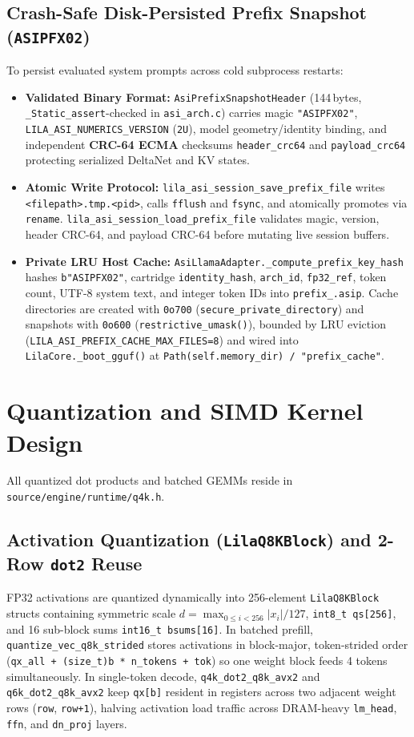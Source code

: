 \documentclass[11pt,a4paper]{article}
\begin{document}
\subsection{Crash-Safe Disk-Persisted Prefix Snapshot (\texttt{ASIPFX02})}
To persist evaluated system prompts across cold subprocess restarts:
\begin{itemize}
    \item \textbf{Validated Binary Format:} \texttt{AsiPrefixSnapshotHeader} (144\,bytes, \texttt{\_Static\_assert}-checked in \texttt{asi\_arch.c}) carries magic \texttt{"ASIPFX02"}, \texttt{LILA\_ASI\_NUMERICS\_VERSION} (\texttt{2U}), model geometry/identity binding, and independent \textbf{CRC-64 ECMA} checksums \texttt{header\_crc64} and \texttt{payload\_crc64} protecting serialized DeltaNet and KV states.
    \item \textbf{Atomic Write Protocol:} \texttt{lila\_asi\_session\_save\_prefix\_file} writes \texttt{<filepath>.tmp.<pid>}, calls \texttt{fflush} and \texttt{fsync}, and atomically promotes via \texttt{rename}. \texttt{lila\_asi\_session\_load\_prefix\_file} validates magic, version, header CRC-64, and payload CRC-64 before mutating live session buffers.
    \item \textbf{Private LRU Host Cache:} \texttt{AsiLlamaAdapter.\_compute\_prefix\_key\_hash} hashes \texttt{b"ASIPFX02"}, cartridge \texttt{identity\_hash}, \texttt{arch\_id}, \texttt{fp32\_ref}, token count, UTF-8 system text, and integer token IDs into \texttt{prefix\_<hex16>.asip}. Cache directories are created with \texttt{0o700} (\texttt{secure\_private\_directory}) and snapshots with \texttt{0o600} (\texttt{restrictive\_umask()}), bounded by LRU eviction (\texttt{LILA\_ASI\_PREFIX\_CACHE\_MAX\_FILES=8}) and wired into \texttt{LilaCore.\_boot\_gguf()} at \texttt{Path(self.memory\_dir) / "prefix\_cache"}.
\end{itemize}

\section{Quantization and SIMD Kernel Design}

All quantized dot products and batched GEMMs reside in \texttt{source/engine/runtime/q4k.h}.

\subsection{Activation Quantization (\texttt{LilaQ8KBlock}) and 2-Row \texttt{dot2} Reuse}
FP32 activations are quantized dynamically into 256-element \texttt{LilaQ8KBlock} structs containing symmetric scale $d = \max_{0 \le i < 256}|x_i| / 127$, \texttt{int8\_t qs[256]}, and 16 sub-block sums \texttt{int16\_t bsums[16]}. In batched prefill, \texttt{quantize\_vec\_q8k\_strided} stores activations in block-major, token-strided order (\texttt{qx\_all + (size\_t)b * n\_tokens + tok}) so one weight block feeds 4 tokens simultaneously. In single-token decode, \texttt{q4k\_dot2\_q8k\_avx2} and \texttt{q6k\_dot2\_q8k\_avx2} keep \texttt{qx[b]} resident in registers across two adjacent weight rows (\texttt{row}, \texttt{row+1}), halving activation load traffic across DRAM-heavy \texttt{lm\_head}, \texttt{ffn}, and \texttt{dn\_proj} layers.
\end{document}
